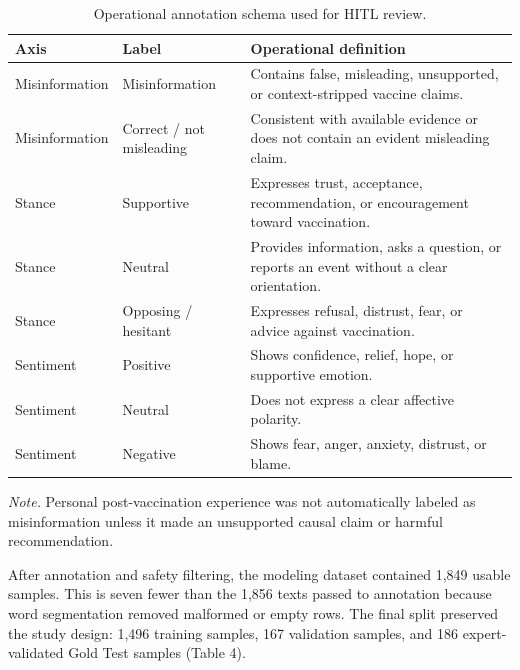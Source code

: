 \documentclass[runningheads]{llncs}
\begin{document}
\begin{table}[t]
\caption{Operational annotation schema used for HITL review.}\label{tab:schema}
\centering
\scriptsize
\setlength{\tabcolsep}{2.5pt}
\renewcommand{\arraystretch}{1.08}
\begin{tabular}{@{}>{\raggedright\arraybackslash}p{}>{\raggedright\arraybackslash}p{}>{\raggedright\arraybackslash}p{}@{}}
\hline
Axis & Label & Operational definition\\
\hline
Misinformation & Misinformation & Contains false, misleading, unsupported, or context-stripped vaccine claims.\\
Misinformation & Correct / not misleading & Consistent with available evidence or does not contain an evident misleading claim.\\
Stance & Supportive & Expresses trust, acceptance, recommendation, or encouragement toward vaccination.\\
Stance & Neutral & Provides information, asks a question, or reports an event without a clear orientation.\\
Stance & Opposing / hesitant & Expresses refusal, distrust, fear, or advice against vaccination.\\
Sentiment & Positive & Shows confidence, relief, hope, or supportive emotion.\\
Sentiment & Neutral & Does not express a clear affective polarity.\\
Sentiment & Negative & Shows fear, anger, anxiety, distrust, or blame.\\
\hline
\end{tabular}
\vspace{2pt}
\parbox{\textwidth}{\footnotesize\emph{Note.} Personal post-vaccination experience was not automatically labeled as misinformation unless it made an unsupported causal claim or harmful recommendation.}
\end{table}

After annotation and safety filtering, the modeling dataset contained 1,849 usable samples. This is seven fewer than the 1,856 texts passed to annotation because word segmentation removed malformed or empty rows. The final split preserved the study design: 1,496 training samples, 167 validation samples, and 186 expert-validated Gold Test samples (Table 4).
\end{document}
